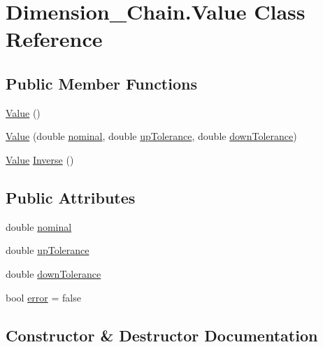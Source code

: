 \hypertarget{class_dimension___chain_1_1_value}{}\section{Dimension\+\_\+\+Chain.\+Value Class Reference}
\label{class_dimension___chain_1_1_value}
\subsection*{Public Member Functions}
\begin{DoxyCompactItemize}
\item 
\mbox{\hyperlink{class_dimension___chain_1_1_value_a20ddc0b81f42f4fd162f00340beb093f}{Value}} ()
\item 
\mbox{\hyperlink{class_dimension___chain_1_1_value_adbce27eeb02d593d6baba31ef988f7a8}{Value}} (double \mbox{\hyperlink{class_dimension___chain_1_1_value_ad8021f1acadd25ca6ed51539a54abcff}{nominal}}, double \mbox{\hyperlink{class_dimension___chain_1_1_value_a527768f61f2911e1ccadcb479974c073}{up\+Tolerance}}, double \mbox{\hyperlink{class_dimension___chain_1_1_value_a03fea4a7e636ffccff17ba0dc711d681}{down\+Tolerance}})
\item 
\mbox{\hyperlink{class_dimension___chain_1_1_value}{Value}} \mbox{\hyperlink{class_dimension___chain_1_1_value_a85d60135a70b5e670bf0a1e1cc0967da}{Inverse}} ()
\end{DoxyCompactItemize}
\subsection*{Public Attributes}
\begin{DoxyCompactItemize}
\item 
double \mbox{\hyperlink{class_dimension___chain_1_1_value_ad8021f1acadd25ca6ed51539a54abcff}{nominal}}
\item 
double \mbox{\hyperlink{class_dimension___chain_1_1_value_a527768f61f2911e1ccadcb479974c073}{up\+Tolerance}}
\item 
double \mbox{\hyperlink{class_dimension___chain_1_1_value_a03fea4a7e636ffccff17ba0dc711d681}{down\+Tolerance}}
\item 
bool \mbox{\hyperlink{class_dimension___chain_1_1_value_a6095f62a5449867ec99c705006846734}{error}} = false
\end{DoxyCompactItemize}


\subsection{Constructor \& Destructor Documentation}
\mbox{\label{class_dimension___chain_1_1_value_a20ddc0b81f42f4fd162f00340beb093f}} 
